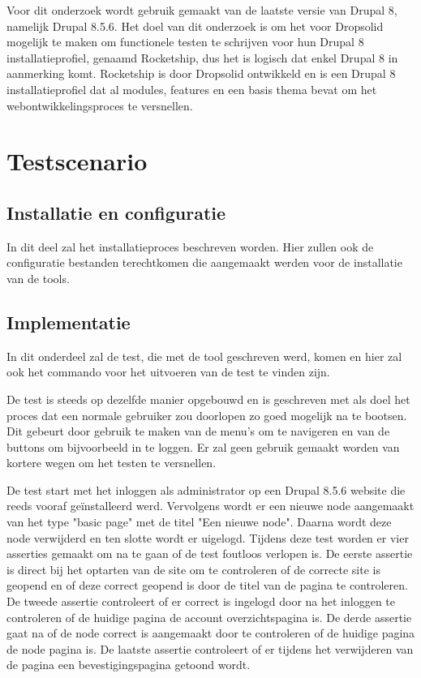 Voor dit onderzoek wordt gebruik gemaakt van de laatste versie van Drupal 8, namelijk Drupal 8.5.6. Het doel van dit onderzoek is om het voor Dropsolid mogelijk te maken om functionele testen te schrijven voor hun Drupal 8 installatieprofiel, genaamd Rocketship, dus het is logisch dat enkel Drupal 8 in aanmerking komt. Rocketship is door Dropsolid ontwikkeld en is een Drupal 8 installatieprofiel dat al modules, features en een basis thema bevat om het webontwikkelingsproces te versnellen.

\clearpage
\section{Testscenario}
\label{testscenario}
\subsection{Installatie en configuratie}
In dit deel zal het installatieproces beschreven worden. Hier zullen ook de configuratie bestanden terechtkomen die aangemaakt werden voor de installatie van de \glspl{tool}.

\subsection{Implementatie}
In dit onderdeel zal de test, die met de \gls{tool} geschreven werd, komen en hier zal ook het commando voor het uitvoeren van de test te vinden zijn.

De test is steeds op dezelfde manier opgebouwd en is geschreven met als doel het proces dat een normale gebruiker zou doorlopen zo goed mogelijk na te bootsen. Dit gebeurt door gebruik te maken van de menu's om te navigeren en van de buttons om bijvoorbeeld in te loggen. Er zal geen gebruik gemaakt worden van kortere wegen om het testen te versnellen.

De test start met het inloggen als administrator op een Drupal 8.5.6 website die reeds vooraf geïnstalleerd werd. Vervolgens wordt er een nieuwe node aangemaakt van het type "basic page" met de titel "Een nieuwe node". Daarna wordt deze node verwijderd en ten slotte wordt er uigelogd. Tijdens deze test worden er vier \glspl{assertie} gemaakt om na te gaan of de test foutloos verlopen is. De eerste \gls{assertie} is direct bij het optarten van de site om te controleren of de correcte site is geopend en of deze correct geopend is door de titel van de pagina te controleren. De tweede \gls{assertie} controleert of er correct is ingelogd door na het inloggen te controleren of de huidige pagina de account overzichtspagina is. De derde \gls{assertie} gaat na of de node correct is aangemaakt door te controleren of de huidige pagina de node pagina is. De laatste \gls{assertie} controleert of er tijdens het verwijderen van de pagina een bevestigingspagina getoond wordt.
